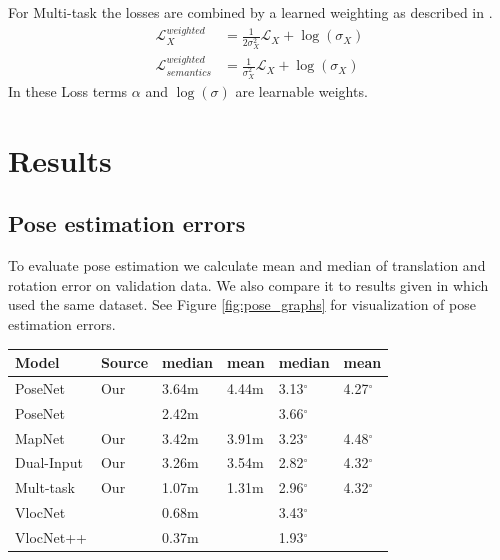 \documentclass[10pt,twocolumn,letterpaper]{article}
\begin{document}
For Multi-task the losses are combined by a learned weighting as described in \cite{kendall2018multi}. 
\begin{align}
\mathcal{L}^{weighted}_X &= \frac{1}{2\sigma^2_X}\mathcal{L}_X+\log(\sigma_X)\\
\mathcal{L}^{weighted}_{semantics} &= \frac{1}{\sigma^2_X}\mathcal{L}_X+\log(\sigma_X)
\end{align}
In these Loss terms $\alpha$ and $\log(\sigma)$ are learnable weights.
\section{Results}
\subsection{Pose estimation errors}
To evaluate pose estimation we calculate mean and median of translation and rotation error on validation data. We also compare it to results given in \cite{radwan18ral} which used the same dataset. See Figure \ref{fig:pose_graphs} for visualization of pose estimation errors.
\begin{tabular}{ll||l|l|l|l}
	Model&Source&median&mean&median&mean\\\hline
	PoseNet & Our &3.64m &4.44m&3.13$^\circ$ &	4.27$^\circ$ \\
	PoseNet & \cite{radwan18ral} &2.42m &&3.66$^\circ$&\\
	MapNet & Our &3.42m &3.91m &3.23$^\circ$&4.48$^\circ$\\
	Dual-Input & Our &3.26m&3.54m&2.82$^\circ$&4.32$^\circ$\\
	Mult-task & Our &1.07m&1.31m&2.96$^\circ$&4.32$^\circ$\\
	VlocNet & \cite{radwan18ral} &0.68m&&3.43$^\circ$&\\
	VlocNet++ & \cite{radwan18ral} &0.37m&&1.93$^\circ$&
\end{tabular}
\end{document}

